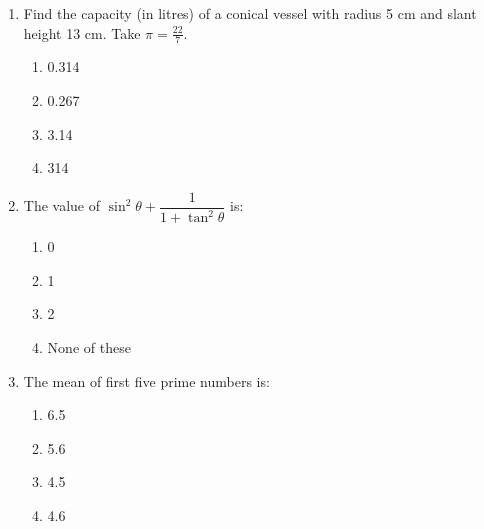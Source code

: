 \begin{enumerate}[label=(\roman*)]

    \item Find the capacity (in litres) of a conical vessel with radius 5 cm
        and slant height 13 cm. Take $\pi = \frac{22}{7}$.

        \begin{multicols}{2}
        \begin{enumerate}[label=(\alph*)]
            \item 0.314
            \item 0.267
            \item 3.14
            \item 314
        \end{enumerate}
        \end{multicols}

    \item The value of $\sin^2 \theta + \dfrac{1}{1 + \tan^2 \theta}$ is:

        \begin{multicols}{2}
        \begin{enumerate}[label=(\alph*)]
            \item 0 
            \item 1 
            \item 2 
            \item None of these
        \end{enumerate}
        \end{multicols}

    \item The mean of first five prime numbers is: 

        \begin{multicols}{2}
        \begin{enumerate}[label=(\alph*)]
            \item 6.5 
            \item 5.6
            \item 4.5 
            \item 4.6
        \end{enumerate}
        \end{multicols}


\end{enumerate}
